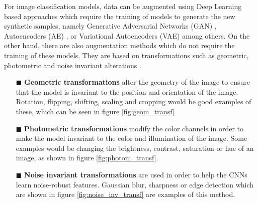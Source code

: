 For image classification models, data can be augmented using Deep Learning based approaches which require the training of models to generate the new synthetic samples, namely Generative Adversarial Networks (GAN) \cite{jiang2020gans}, Autoencoders (AE) \cite{devries2017aes}, or Variational Autoencoders (VAE) \cite{norouzi2020vaes} among others. On the other hand, there are also augmentation methods which do not require the training of these models. They are based on transformations such as geometric, photometric and noise invariant alterations \cite{zoph2020augment,pau2020}.
\begin{itemize}[]
    \item[\tiny$\blacksquare$]\textbf{Geometric transformations} alter the geometry of the image to ensure that the model is invariant to the position and orientation of the image. Rotation, flipping, shifting, scaling and cropping would be good examples of these, which can be seen in figure \ref{fig:geom_transf}
    \item[\tiny$\blacksquare$] \textbf{Photometric transformations} modify the color channels in order to make the model invariant to the color and illumination of the image. Some examples would be changing the brightness, contrast, saturation or hue of an image, as shown in figure \ref{fig:photom_transf}.
    \item[\tiny$\blacksquare$] \textbf{Noise invariant transformations} are used in order to help the CNNs learn noise-robust features. Gaussian blur, sharpness or edge detection which are shown in figure \ref{fig:noise_inv_transf} are examples of this method.
\end{itemize}

